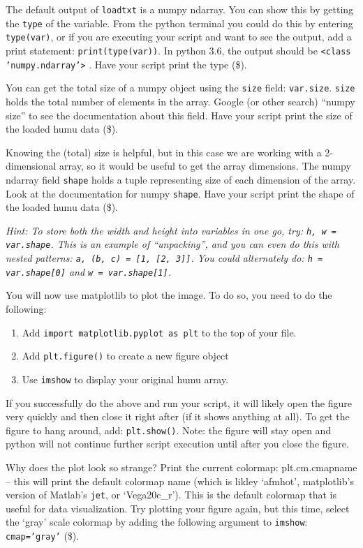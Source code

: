 \documentclass[10pt]{article}
\begin{document}
\begin{enumerate}
The default output of {\tt loadtxt} is a numpy ndarray.  You can show this by getting the {\tt type} of the variable.  From the python terminal you could do this by entering {\tt type(var)}, or if you are executing your script and want to see the output, add a print statement: {\tt print(type(var))}.  In python 3.6, the output should be {\tt <class 'numpy.ndarray'>} .  Have your script print the type (\$).

You can get the total size of a numpy object using the {\tt size} field: {\tt var.size}.  {\tt size} holds the total number of elements in the array.  Google (or other search) ``numpy size'' to see the documentation about this field.  Have your script print the size of the loaded humu data (\$).

Knowing the (total) size is helpful, but in this case we are working with a 2-dimensional array, so it would be useful to get the array dimensions.  The numpy ndarray field {\tt shape} holds a tuple representing size of each dimension of the array.  Look at the documentation for numpy {\tt shape}.  Have your script print the shape of the loaded humu data (\$).

{\em Hint: To store both the width and height into variables in one go, try: {\tt h, w = var.shape}.  This is an example of ``unpacking'', and you can even do this with nested patterns: {\tt a, (b, c) = [1, [2, 3]]}.  You could alternately do: {\tt h = var.shape[0]} and {\tt w = var.shape[1]}.}

You will now use matplotlib to plot the image.  To do so, you need to do the following:
\begin{enumerate}
\item Add {\tt import matplotlib.pyplot as plt} to the top of your file.
\item Add {\tt plt.figure()} to create a new figure object
\item Use {\tt imshow} to display your original humu array.
\end{enumerate}
If you successfully do the above and run your script, it will likely open the figure very quickly and then close it right after (if it shows anything at all).  To get the figure to hang around, add: {\tt plt.show()}.  Note: the figure will stay open and python will not continue further script execution until after you close the figure.

Why does the plot look so strange?  Print the current colormap: {plt.cm.cmapname} -- this will print the default colormap name (which is likley `afmhot', matplotlib's version of Matlab's {\tt jet}, or `Vega20c\_r').  This is the default colormap that is useful for data visualization.  Try plotting your figure again, but this time, select the `gray' scale colormap by adding the following argument to {\tt imshow}: {\tt cmap='gray'} (\$).


\end{enumerate}
\end{document}
